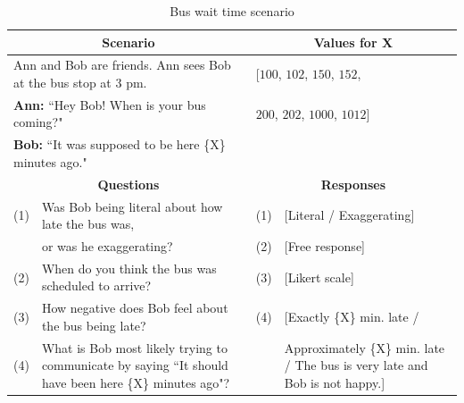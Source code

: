 \documentclass{article} %
\begin{document}
\begin{table}[h]
\begin{tabular}{| p{0.15cm}  p{8.15cm}| p{0.15cm}p{4cm} |}\hline
\multicolumn{2}{|c|}{\textbf{Scenario}} & \multicolumn{2}{c|}{\textbf{Values for X}} \\\hline
\multicolumn{2}{|l|}{Ann and Bob are friends. Ann sees Bob at the bus stop at 3 pm.} & \multicolumn{2}{l|}{[$100$, $102$, $150$, $152$,}\\
\multicolumn{2}{|l|}{\textbf{Ann:} ``Hey Bob! When is your bus coming?"} & \multicolumn{2}{l|}{$200$, $202$, $1000$, $1012$]}\\
\multicolumn{2}{|l|}{\textbf{Bob:} ``It was supposed to be here \{X\} minutes ago."} & \multicolumn{2}{l|}{}\\\hline
\multicolumn{2}{|c|}{\textbf{Questions}} & \multicolumn{2}{c|}{\textbf{Responses}} \\\hline
(1) & Was Bob being literal about how late the bus was, & (1) &[Literal / Exaggerating] \\
 & or was he exaggerating? & (2) & [Free response] \\
(2) & When do you think the bus was scheduled to arrive? & (3) & [Likert scale] \\
(3) & How negative does Bob feel about the bus being late? & (4) & [Exactly \{X\} min. late / \\
(4) & What is Bob most likely trying to communicate by saying  ``It should have been here \{X\} minutes ago"? & & Approximately \{X\} min. late / The bus is very late and Bob is not happy.]\\\hline
\end{tabular}
\caption{Bus wait time scenario}
\label{tab:bustable}
\end{table}
\end{document}
